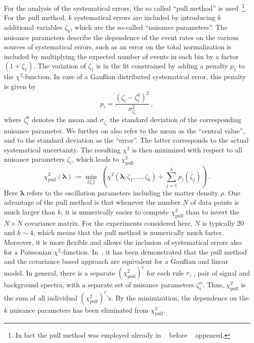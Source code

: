 For the analysis of the systematical errors, the so called 
 ``pull method'' is used~\cite{Fogli:2002pt}\footnote{In fact the pull 
method was employed already in \Ref~\cite{Huber:2002mx} before 
\Ref~\cite{Fogli:2002pt} appeared.}. 
For the pull method, $k$ systematical errors are included by introducing 
$k$ additional variables $\zeta_k$, which are the 
so-called ``nuisance parameters''. 
The nuisance parameters describe the dependence 
of the event rates on the various sources of systematical errors, 
such as an error on the total 
normalization is included by multiplying the expected number of events in 
each bin by a factor $(1+\zeta_1)$. The variation of $\zeta_1$ is in the fit 
constrained by adding a penalty $p_1$ to the $\chi^2$-function. In case 
of a  Gau\ss ian distributed systematical error, this penalty is 
given by
\begin{equation}
\label{eq:penalty}
p_i=\frac{(\zeta_i-\zeta_i^0)^2}{\sigma_{\zeta_i}^2}\,,
\end{equation}
where $\zeta_i^0$ denotes the mean and $\sigma_{\zeta_i}$ the standard 
deviation of the corresponding nuisance parameter. We further on also refer
to the mean as the ``central value'', and to the standard deviation as
the ``error''. The latter corresponds to the actual systematical uncertainty. 
The resulting $\chi^2$ is then minimized with respect to all nuisance 
parameters $\zeta_i$, which leads to $\chi^2_\mathrm{pull}$
\begin{equation}
\chi^2_\mathrm{pull}(\boldsymbol{\lambda}):=\min_{\{\zeta_i\} } \,\, \left( 
\chi^2(\boldsymbol{\lambda},
\zeta_1, \ldots, \zeta_k)+ \sum_{j=1}^{k} p_j(\zeta_j)\right)\,.
\end{equation}
Here $\boldsymbol{\lambda}$ refers to the oscillation parameters 
including the matter density
$\rho$. One advantage of the pull method is that whenever the number $N$ of 
data points is much larger than $k$, it is numerically easier to compute 
$\chi^2_\mathrm{pull}$ than to invert the $N\times N$ covariance matrix. For
the experiments considered here, $N$ is typically $20$ and $k\sim 4$, 
which means that the pull method is numerically much faster. Moreover,
 it is more flexible and  allows the inclusion of systematical errors 
also for a  Poissonian $\chi^2$-function.
In~\cite{Fogli:2002pt}, it has been demonstrated that the pull method 
and the covariance based approach are equivalent for a Gau\ss ian and 
linear model. In general,
there is a separate $(\chi^2_\mathrm{pull})^r$ for each rule $r$, 
\ie , pair of signal and background spectra, with a separate set of 
nuisance parameters $\zeta_i^\alpha$. Thus, $\chi^2_\mathrm{pull}$
is the sum of all individual  $(\chi^2_\mathrm{pull})^r$'s.
By the minimization, the dependence on the $k$ nuisance parameters has been eliminated  from $\chi^2_\mathrm{pull}$. 

